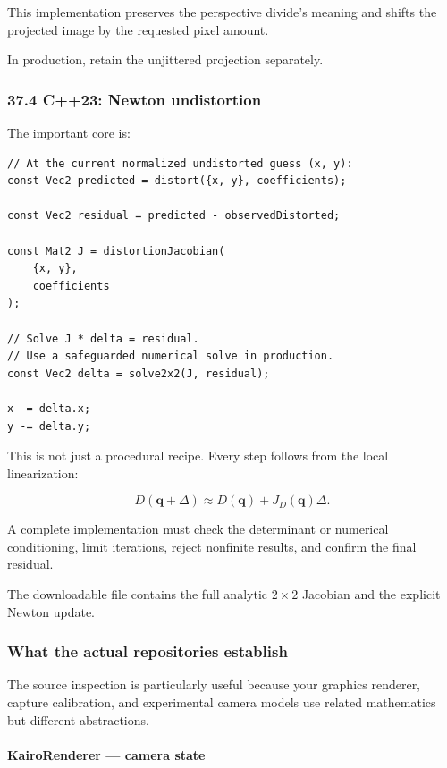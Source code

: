 This implementation preserves the perspective divide's meaning and shifts the projected image by the requested pixel amount.

In production, retain the unjittered projection separately.

\subsubsection{37.4 C++23: Newton undistortion}\label{c23-newton-undistortion}

The important core is:

\begin{verbatim}
// At the current normalized undistorted guess (x, y):
const Vec2 predicted = distort({x, y}, coefficients);

const Vec2 residual = predicted - observedDistorted;

const Mat2 J = distortionJacobian(
    {x, y},
    coefficients
);

// Solve J * delta = residual.
// Use a safeguarded numerical solve in production.
const Vec2 delta = solve2x2(J, residual);

x -= delta.x;
y -= delta.y;
\end{verbatim}

This is not just a procedural recipe. Every step follows from the local linearization:

\[
 D(\mathbf q+\Delta) \approx D(\mathbf q)+J_D(\mathbf q)\Delta.
\]

A complete implementation must check the determinant or numerical conditioning, limit iterations, reject nonfinite results, and confirm the final residual.

The downloadable file contains the full analytic \(2\times2\) Jacobian and the explicit Newton update.

\subsubsection{What the actual repositories establish}\label{what-the-actual-repositories-establish}

The source inspection is particularly useful because your graphics renderer, capture calibration, and experimental camera models use related mathematics but different abstractions.

\paragraph{KairoRenderer --- camera state}\label{kairorenderer-camera-state}

